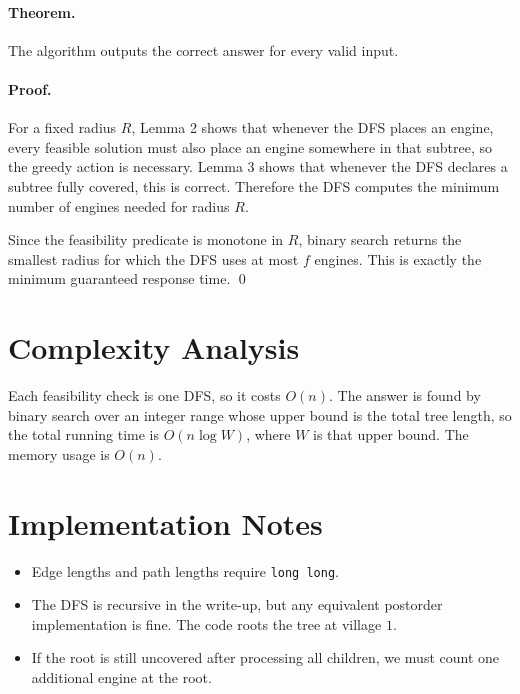\documentclass[11pt]{article}
\begin{document}
\paragraph{Theorem.}
The algorithm outputs the correct answer for every valid input.

\paragraph{Proof.}
For a fixed radius $R$, Lemma 2 shows that whenever the DFS places an engine, every feasible solution must also place an engine somewhere in that subtree, so the greedy action is necessary. Lemma 3 shows that whenever the DFS declares a subtree fully covered, this is correct. Therefore the DFS computes the minimum number of engines needed for radius $R$.

Since the feasibility predicate is monotone in $R$, binary search returns the smallest radius for which the DFS uses at most $f$ engines. This is exactly the minimum guaranteed response time. \qed

\section*{Complexity Analysis}

Each feasibility check is one DFS, so it costs $O(n)$. The answer is found by binary search over an integer range whose upper bound is the total tree length, so the total running time is $O(n \log W)$, where $W$ is that upper bound. The memory usage is $O(n)$.

\section*{Implementation Notes}

\begin{itemize}[leftmargin=*]
    \item Edge lengths and path lengths require \texttt{long long}.
    \item The DFS is recursive in the write-up, but any equivalent postorder implementation is fine. The code roots the tree at village $1$.
    \item If the root is still uncovered after processing all children, we must count one additional engine at the root.
\end{itemize}
\end{document}
